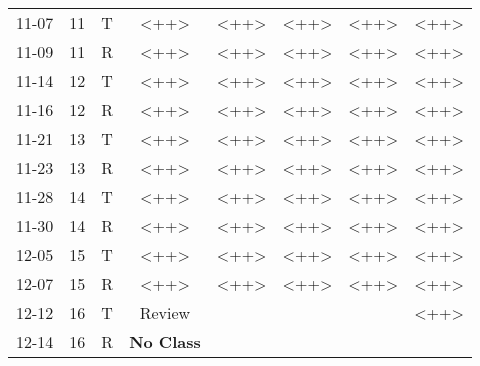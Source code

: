 \documentclass[11pt, a4paper]{article}
\begin{document}
\begin{table}[h]
\begin{center}
\begin{tabular}{lllcllll}
11-07 & 11 & T & <++> & <++> & <++> & <++> & <++>\\
11-09 & 11 & R & <++> & <++> & <++> & <++> & <++>\\
11-14 & 12 & T & <++> & <++> & <++> & <++> & <++>\\
11-16 & 12 & R & <++> & <++> & <++> & <++> & <++>\\
11-21 & 13 & T & <++> & <++> & <++> & <++> & <++>\\
11-23 & 13 & R & <++> & <++> & <++> & <++> & <++>\\
11-28 & 14 & T & <++> & <++> & <++> & <++> & <++>\\
11-30 & 14 & R & <++> & <++> & <++> & <++> & <++>\\
12-05 & 15 & T & <++> & <++> & <++> & <++> & <++>\\
12-07 & 15 & R & <++> & <++> & <++> & <++> & <++>\\
12-12 & 16 & T & Review &  &  &  & <++>\\
12-14 & 16 & R & \textbf{No Class} &  &  &  & \\
\end{tabular}
\end{center}
\end{table}
\end{document}
